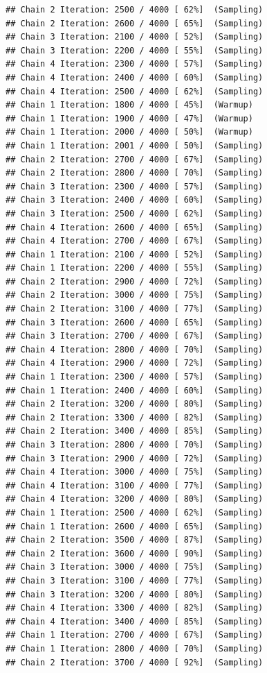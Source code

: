 \documentclass[
]{article}
\begin{document}
\begin{verbatim}
## Chain 2 Iteration: 2500 / 4000 [ 62%]  (Sampling) 
## Chain 2 Iteration: 2600 / 4000 [ 65%]  (Sampling) 
## Chain 3 Iteration: 2100 / 4000 [ 52%]  (Sampling) 
## Chain 3 Iteration: 2200 / 4000 [ 55%]  (Sampling) 
## Chain 4 Iteration: 2300 / 4000 [ 57%]  (Sampling) 
## Chain 4 Iteration: 2400 / 4000 [ 60%]  (Sampling) 
## Chain 4 Iteration: 2500 / 4000 [ 62%]  (Sampling) 
## Chain 1 Iteration: 1800 / 4000 [ 45%]  (Warmup) 
## Chain 1 Iteration: 1900 / 4000 [ 47%]  (Warmup) 
## Chain 1 Iteration: 2000 / 4000 [ 50%]  (Warmup) 
## Chain 1 Iteration: 2001 / 4000 [ 50%]  (Sampling) 
## Chain 2 Iteration: 2700 / 4000 [ 67%]  (Sampling) 
## Chain 2 Iteration: 2800 / 4000 [ 70%]  (Sampling) 
## Chain 3 Iteration: 2300 / 4000 [ 57%]  (Sampling) 
## Chain 3 Iteration: 2400 / 4000 [ 60%]  (Sampling) 
## Chain 3 Iteration: 2500 / 4000 [ 62%]  (Sampling) 
## Chain 4 Iteration: 2600 / 4000 [ 65%]  (Sampling) 
## Chain 4 Iteration: 2700 / 4000 [ 67%]  (Sampling) 
## Chain 1 Iteration: 2100 / 4000 [ 52%]  (Sampling) 
## Chain 1 Iteration: 2200 / 4000 [ 55%]  (Sampling) 
## Chain 2 Iteration: 2900 / 4000 [ 72%]  (Sampling) 
## Chain 2 Iteration: 3000 / 4000 [ 75%]  (Sampling) 
## Chain 2 Iteration: 3100 / 4000 [ 77%]  (Sampling) 
## Chain 3 Iteration: 2600 / 4000 [ 65%]  (Sampling) 
## Chain 3 Iteration: 2700 / 4000 [ 67%]  (Sampling) 
## Chain 4 Iteration: 2800 / 4000 [ 70%]  (Sampling) 
## Chain 4 Iteration: 2900 / 4000 [ 72%]  (Sampling) 
## Chain 1 Iteration: 2300 / 4000 [ 57%]  (Sampling) 
## Chain 1 Iteration: 2400 / 4000 [ 60%]  (Sampling) 
## Chain 2 Iteration: 3200 / 4000 [ 80%]  (Sampling) 
## Chain 2 Iteration: 3300 / 4000 [ 82%]  (Sampling) 
## Chain 2 Iteration: 3400 / 4000 [ 85%]  (Sampling) 
## Chain 3 Iteration: 2800 / 4000 [ 70%]  (Sampling) 
## Chain 3 Iteration: 2900 / 4000 [ 72%]  (Sampling) 
## Chain 4 Iteration: 3000 / 4000 [ 75%]  (Sampling) 
## Chain 4 Iteration: 3100 / 4000 [ 77%]  (Sampling) 
## Chain 4 Iteration: 3200 / 4000 [ 80%]  (Sampling) 
## Chain 1 Iteration: 2500 / 4000 [ 62%]  (Sampling) 
## Chain 1 Iteration: 2600 / 4000 [ 65%]  (Sampling) 
## Chain 2 Iteration: 3500 / 4000 [ 87%]  (Sampling) 
## Chain 2 Iteration: 3600 / 4000 [ 90%]  (Sampling) 
## Chain 3 Iteration: 3000 / 4000 [ 75%]  (Sampling) 
## Chain 3 Iteration: 3100 / 4000 [ 77%]  (Sampling) 
## Chain 3 Iteration: 3200 / 4000 [ 80%]  (Sampling) 
## Chain 4 Iteration: 3300 / 4000 [ 82%]  (Sampling) 
## Chain 4 Iteration: 3400 / 4000 [ 85%]  (Sampling) 
## Chain 1 Iteration: 2700 / 4000 [ 67%]  (Sampling) 
## Chain 1 Iteration: 2800 / 4000 [ 70%]  (Sampling) 
## Chain 2 Iteration: 3700 / 4000 [ 92%]  (Sampling) 

\end{verbatim}
\end{document}
